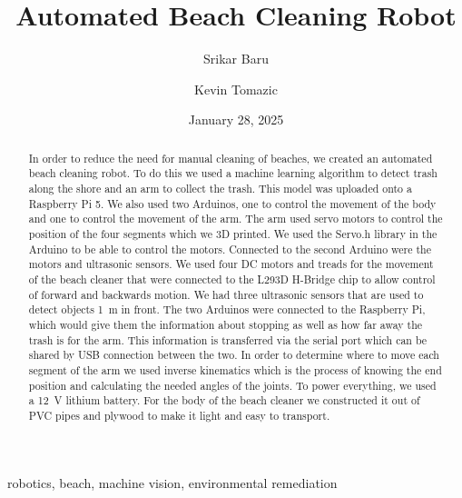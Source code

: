 \documentclass[12pt,conference,onecolumn]{IEEEtran}
\title{Automated Beach Cleaning Robot}
\author{Srikar Baru \and Kevin Tomazic}
\date{January 28, 2025}
\newcommand{\keywords}{robotics, beach, machine vision, environmental remediation}
\begin{document}
\maketitle 

\begin{abstract}
In order to reduce the need for manual cleaning of beaches, we created an automated beach cleaning robot. To do this we used a machine learning algorithm to detect trash along the shore and an arm to collect the trash. This model was uploaded onto a Raspberry Pi 5. We also used two Arduinos, one to control the movement of the body and one to control the movement of the arm. The arm used servo motors to control the position of the four segments which we 3D printed. We used the Servo.h library in the Arduino to be able to control the motors. Connected to the second Arduino were the motors and ultrasonic sensors. We used four DC motors and treads for the movement of the beach cleaner that were connected to the L293D H-Bridge chip to allow control of forward and backwards motion. We had three ultrasonic sensors that are used to detect objects \qty{1}{\meter} in front. The two Arduinos were connected to the Raspberry Pi, which would give them the information about stopping as well as how far away the trash is for the arm. This information is transferred via the serial port which can be shared by USB connection between the two. In order to determine where to move each segment of the arm we used inverse kinematics which is the process of knowing the end position and calculating the needed angles of the joints. To power everything, we used a \qty{12}{\volt} lithium battery. For the body of the beach cleaner we constructed it out of PVC pipes and plywood to make it light and easy to transport.
\end{abstract}

\begin{IEEEkeywords}
\keywords
\end{IEEEkeywords}
\end{document}
